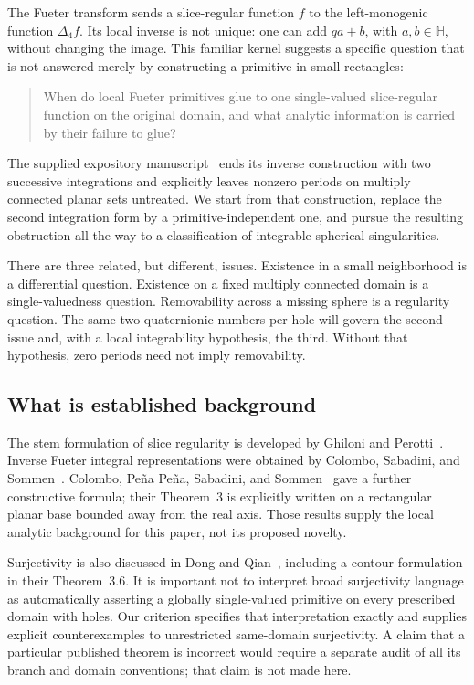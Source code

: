 \documentclass[11pt,a4paper]{article}
\numberwithin{equation}{section}
\theoremstyle{definition}
\theoremstyle{remark}
\newcommand{\HH}{\mathbb H}
\newcommand{\lap}{\Delta_4}
\begin{document}
The Fueter transform sends a slice-regular function $f$ to the left-monogenic
function $\lap f$. Its local inverse is not unique: one can add $qa+b$, with
$a,b\in\HH$, without changing the image. This familiar kernel suggests a
specific question that is not answered merely by constructing a primitive in
small rectangles:
\begin{quote}
When do local Fueter primitives glue to one single-valued slice-regular
function on the original domain, and what analytic information is carried
by their failure to glue?
\end{quote}
The supplied expository manuscript~\cite{Uploaded} ends its inverse construction
with two successive integrations and explicitly leaves nonzero periods on
multiply connected planar sets untreated. We start from that construction,
replace the second integration form by a primitive-independent one, and pursue
the resulting obstruction all the way to a classification of integrable
spherical singularities.

There are three related, but different, issues. Existence in a small
neighborhood is a differential question. Existence on a fixed multiply
connected domain is a single-valuedness question. Removability across a
missing sphere is a regularity question. The same two quaternionic numbers
per hole will govern the second issue and, with a local integrability
hypothesis, the third. Without that hypothesis, zero periods need not imply
removability.

\subsection{What is established background}
The stem formulation of slice regularity is developed by Ghiloni and
Perotti~\cite{GP}. Inverse Fueter integral representations were obtained by
Colombo, Sabadini, and Sommen~\cite{CSS}. Colombo, Pe\~na Pe\~na, Sabadini,
and Sommen~\cite{CPSS} gave a further constructive formula; their
Theorem~3 is explicitly written on a rectangular planar base bounded away
from the real axis. Those results supply the local analytic background for
this paper, not its proposed novelty.

Surjectivity is also discussed in Dong and Qian~\cite{DQ}, including a
contour formulation in their Theorem~3.6. It is important not to interpret
broad surjectivity language as automatically asserting a globally
single-valued primitive on every prescribed domain with holes. Our criterion
specifies that interpretation exactly and supplies explicit counterexamples
to unrestricted same-domain surjectivity. A claim that a particular published
theorem is incorrect would require a separate audit of all its branch and
domain conventions; that claim is not made here.
\end{document}
